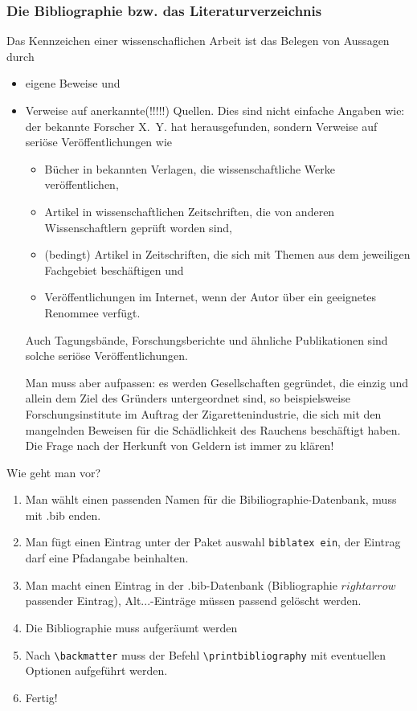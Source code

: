 \documentclass[ngerman,               %
               a4paper,               %
               fleqn,                 %
                     ]{scrartcl}       %
\begin{document}
\subsubsection{Die Bibliographie bzw. das Literaturverzeichnis}

Das Kennzeichen einer wissenschaflichen Arbeit ist das Belegen von Aussagen
durch
\begin{itemize}
  \item eigene Beweise und
  \item Verweise auf anerkannte(!!!!!) Quellen. Dies sind nicht einfache
    Angaben wie: der bekannte Forscher X.~Y. hat herausgefunden, sondern
    Verweise auf seriöse Veröffentlichungen wie
    \begin{itemize}
      \item Bücher in bekannten Verlagen, die wissenschaftliche Werke
        veröffentlichen,
      \item Artikel in wissenschaftlichen Zeitschriften, die von anderen
        Wissenschaftlern geprüft worden sind,
      \item (bedingt) Artikel in Zeitschriften, die sich mit Themen aus dem
        jeweiligen Fachgebiet beschäftigen und
      \item Veröffentlichungen im Internet, wenn der Autor über ein
        geeignetes Renommee verfügt.
    \end{itemize}
    Auch Tagungsbände, Forschungsberichte und ähnliche Publikationen sind
    solche seriöse Veröffentlichungen.

    Man muss aber aufpassen: es werden Gesellschaften gegründet, die einzig
    und allein dem Ziel des Gründers untergeordnet sind, so beispielsweise
    Forschungsinstitute im Auftrag der Zigarettenindustrie, die sich mit
    den mangelnden Beweisen für die Schädlichkeit des Rauchens beschäftigt
    haben. Die Frage nach der Herkunft von Geldern ist immer zu klären!
\end{itemize}

Wie geht man vor?
\begin{enumerate}
  \item Man wählt einen passenden Namen für die Bibiliographie-Datenbank,
    muss mit .bib enden.
  \item Man fügt einen \lstinline||
    Eintrag unter der Paket auswahl \texttt{biblatex ein}, der Eintrag
    darf eine Pfadangabe beinhalten.
  \item Man macht einen Eintrag in der .bib-Datenbank (Bibliographie
    \(rightarrow\) passender Eintrag), Alt...-Einträge müssen passend
    gelöscht werden.
  \item Die Bibliographie muss aufgeräumt werden
  \item Nach \lstinline|\backmatter| muss der Befehl
    \lstinline|\printbibliography| mit eventuellen Optionen aufgeführt
    werden.
  \item Fertig!
\end{enumerate}
\end{document}
